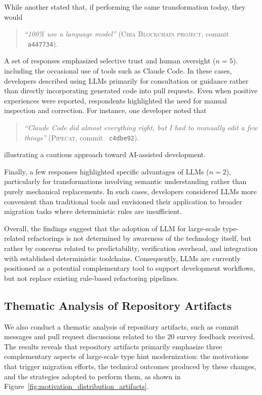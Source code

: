 While another stated that, if performing the same transformation today, they would 

\begin{quote}

\textit{``100\% use a language model''} (\textsc{Chia Blockchain project}, commit ~\texttt{a447734}).
\end{quote}


A set of responses emphasized selective trust and human oversight ($n = 5$). including the occasional use of tools such as Claude Code. In these cases, developers described using LLMs primarily for consultation or guidance rather than directly incorporating generated code into pull requests. Even when positive experiences were reported, respondents highlighted the need for manual inspection and correction. For instance, one developer noted that 
\begin{quote}
\textit{``Claude Code did almost everything right, but I had to manually edit a few things''} (\textsc{Pipecat}, commit ~\texttt{c4dbe92}).
\end{quote}
illustrating a cautious approach toward AI-assisted development.

Finally, a few responses highlighted specific advantages of LLMs ($n = 2$), particularly for transformations involving semantic understanding rather than purely mechanical replacements. In such cases, developers considered LLMs more convenient than traditional tools and envisioned their application to broader migration tasks where deterministic rules are insufficient.

Overall, the findings suggest that the adoption of LLM for large-scale type-related refactorings is not determined by awareness of the technology itself, but rather by concerns related to predictability, verification overhead, and integration with established deterministic toolchains. Consequently, LLMs are currently positioned as a potential complementary tool to support development workflows, but not replace existing rule-based refactoring pipelines.

\subsection{Thematic Analysis of Repository Artifacts}
We also conduct a thematic analysis of repository artifacts, such as commit messages and pull request discussions related to the 20 survey feedback received. The results reveals that repository artifacts primarily emphasize three complementary aspects of large-scale type hint modernization: the motivations that trigger migration efforts, the technical outcomes produced by these changes, and the strategies adopted to perform them, as shown in Figure~\ref{fig:motivation_distribution_artifacts}.


